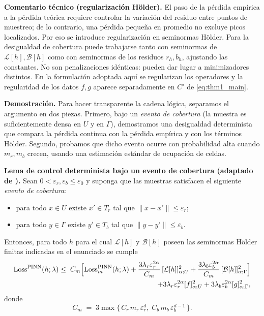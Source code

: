 \medskip
\noindent\textbf{Comentario técnico (regularización Hölder).}
El paso de la pérdida empírica a la pérdida teórica requiere controlar la variación del residuo entre puntos de muestreo; de lo contrario,
una pérdida pequeña en promedio no excluye picos localizados. Por eso se introduce regularización en seminormas Hölder.
Para la desigualdad de cobertura puede trabajarse tanto con seminormas de
$\mathcal L[h],\mathcal B[h]$ como con seminormas de los residuos
$r_h,b_h$, ajustando las constantes. No son penalizaciones idénticas:
pueden dar lugar a minimizadores distintos. En la formulación adoptada aquí
se regularizan los operadores y la regularidad de los datos $f,g$ aparece
separadamente en $C'$ de \eqref{eq:thm1_main}.


\medskip
\noindent\textbf{Demostración.}
Para hacer transparente la cadena lógica, separamos el argumento en dos piezas.
Primero, bajo un \emph{evento de cobertura} (la muestra es suficientemente densa en $U$ y en $\Gamma$),
demostramos una desigualdad determinista que compara la pérdida continua con la pérdida empírica y con los
términos Hölder. Segundo, probamos que dicho evento ocurre con probabilidad alta cuando $m_r,m_b$ crecen,
usando una estimación estándar de ocupación de celdas.


\medskip
\noindent\textbf{Lema de control determinista bajo un evento de cobertura (adaptado de \cite[Lemma~B.1]{shin2020convergence}).}
Sean $0<\varepsilon_r,\varepsilon_b\leq\varepsilon_0$ y suponga que las muestras satisfacen el siguiente \emph{evento de cobertura}:
\begin{itemize}
\item para todo $x\in U$ existe $x'\in T_r$ tal que $\|x-x'\|\le \varepsilon_r$;
\item para todo $y\in\Gamma$ existe $y'\in T_b$ tal que $\|y-y'\|\le \varepsilon_b$.
\end{itemize}
Entonces, para todo $h$ para el cual $\mathcal L[h]$ y $\mathcal B[h]$ poseen las seminormas H\"older finitas indicadas en el enunciado se cumple
\begin{equation}\label{eq:lemB1}
\begin{aligned}
\text{\rm Loss}^{\text{\rm PINN}}(h;\lambda)
\le\; C_m\Big[
\text{\rm Loss}^{\text{\rm PINN}}_m(h;\lambda)
+\frac{3\lambda_r\varepsilon_r^{2\alpha}}{C_m}\,[\mathcal L[h]]_{\alpha;U}^2
+\frac{3\lambda_b\varepsilon_b^{2\alpha}}{C_m}\,[\mathcal B[h]]_{\alpha;\Gamma}^2
\Big]
\\
\quad + 3\lambda_r\varepsilon_r^{2\alpha}[f]_{\alpha;U}^2
+3\lambda_b\varepsilon_b^{2\alpha}[g]_{\alpha;\Gamma}^2,
\end{aligned}
\end{equation}
donde
\[
C_m \;=\; 3\max\{\,C_r\,m_r\,\varepsilon_r^d,\;C_b\,m_b\,\varepsilon_b^{d-1}\,\}.
\]


